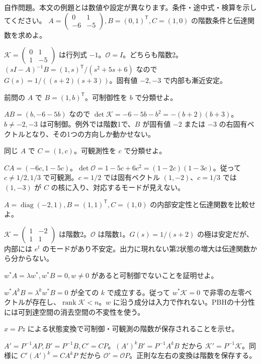 \documentclass[11pt]{article}
\begin{document}
自作問題。本文の例題とは数値や設定が異なります。条件・途中式・検算を示してください。
\problem[可制御と可観測]
$A=\begin{pmatrix}0&1\\-6&-5\end{pmatrix},B=(0,1)^{\mathsf T},C=(1,0)$ の階数条件と伝達関数を求めよ。
\begin{ans}
$\mathcal K=\begin{pmatrix}0&1\\1&-5\end{pmatrix}$ は行列式 $-1$。$\mathcal O=I$。どちらも階数2。$(sI-A)^{-1}B=(1,s)^{\mathsf T}/(s^2+5s+6)$ なので $G(s)=1/((s+2)(s+3))$。固有値 $-2,-3$ で内部も漸近安定。
\end{ans}
\problem[文字入り入力]
前問の $A$ で $B=(1,b)^{\mathsf T}$。可制御性を $b$ で分類せよ。
\begin{ans}
$AB=(b,-6-5b)$ なので $\det\mathcal K=-6-5b-b^2=-(b+2)(b+3)$。$b\ne-2,-3$ は可制御。例外では階数1で、$B$ が固有値 $-2$ または $-3$ の右固有ベクトルとなり、その1つの方向しか動かせない。
\end{ans}
\newpage
\problem[文字入り出力]
同じ $A$ で $C=(1,c)$。可観測性を $c$ で分類せよ。
\begin{ans}
$CA=(-6c,1-5c)$。$\det\mathcal O=1-5c+6c^2=(1-2c)(1-3c)$。従って $c\ne1/2,1/3$ で可観測。$c=1/2$ では固有ベクトル $(1,-2)$、$c=1/3$ では $(1,-3)$ が $C$ の核に入り、対応するモードが見えない。
\end{ans}
\problem[隠れた不安定性]
$A=\operatorname{diag}(-2,1),B=(1,1)^{\mathsf T},C=(1,0)$ の内部安定性と伝達関数を比較せよ。
\begin{ans}
$\mathcal K=\begin{pmatrix}1&-2\\1&1\end{pmatrix}$ は階数2。$\mathcal O$ は階数1。$G(s)=1/(s+2)$ の極は安定だが、内部には $e^t$ のモードがあり不安定。出力に現れない第2状態の増大は伝達関数から分からない。
\end{ans}
\newpage
\problem[PBHの必要性]
$w^*A=\lambda w^*,w^*B=0,w\ne0$ があると可制御でないことを証明せよ。
\begin{ans}
$w^*A^kB=\lambda^kw^*B=0$ が全ての $k$ で成立する。従って $w^*\mathcal K=0$ で非零の左零ベクトルが存在し、$\operatorname{rank}\mathcal K<n$。$w$ に沿う成分は入力で作れない。PBHの十分性には可到達空間の消去空間の不変性を使う。
\end{ans}
\problem[基底変換]
$x=Pz$ による状態変換で可制御・可観測の階数が保存されることを示せ。
\begin{ans}
$A\prime=P^{-1}AP,B\prime=P^{-1}B,C\prime=CP$。$(A\prime)^kB\prime=P^{-1}A^kB$ だから $\mathcal K\prime=P^{-1}\mathcal K$。同様に $C\prime(A\prime)^k=CA^kP$ だから $\mathcal O\prime=\mathcal OP$。正則な左右の変換は階数を保存する。
\end{ans}
\end{document}
